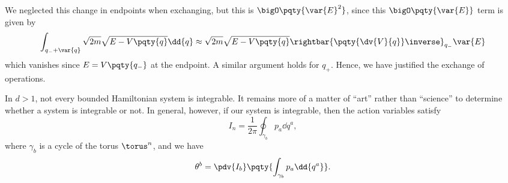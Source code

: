 We neglected this change in endpoints when exchanging, but this is \(\bigO \pqty{\var{E}^2}\), since this \(\bigO\pqty{\var{E}}\) term is given by
\begin{equation}
    \int_{q_- + \var{q}} \sqrt{2m} \sqrt{E - V\pqty{q}} \dd{q} \approx \sqrt{2m} \sqrt{E - V\pqty{q}} \rightbar{\pqty{\dv{V}{q}}\inverse}_{q_-} \var{E}
\end{equation}
which vanishes since \(E = V\pqty{q_-}\) at the endpoint. A similar argument holds for \(q_+\). Hence, we have justified the exchange of operations.

In \(d > 1\), not every bounded Hamiltonian system is integrable. It remains more of a matter of ``art'' rather than ``science'' to determine whether a system is integrable or not. In general, however, if our system is integrable, then the action variables satisfy
\begin{equation}
    I_n = \frac{1}{2\pi} \oint_{\gamma_b} p_a \dd{q^a},
\end{equation}
where \(\gamma_b\) is a cycle of the torus \(\torus^n\), and we have
\begin{equation}
    \theta^b = \pdv{I_b} \pqty{\int_{\gamma_b} p_a \dd{q^a}}.
\end{equation}


